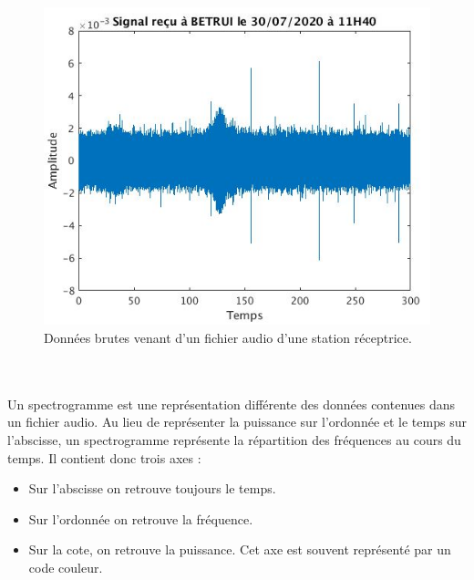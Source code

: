 \documentclass[11pt]{article}
\begin{document}
\begin{figure}[t] %
    \begin{center}
        \includegraphics[scale=0.5]{wav_brut.png}
        \caption{Données brutes venant d'un fichier audio d'une station réceptrice.}
    \end{center}
\end{figure}
\\
\\
Un spectrogramme est une représentation différente des données contenues dans un fichier audio.
Au lieu de représenter la puissance sur l'ordonnée et le temps sur l'abscisse, un spectrogramme représente la répartition des fréquences au cours du temps.
Il contient donc trois axes :
\begin{itemize}
    \item Sur l'abscisse on retrouve toujours le temps.
    \item Sur l'ordonnée on retrouve la fréquence.
    \item Sur la cote, on retrouve la puissance. Cet axe est souvent représenté par un code couleur.
\end{itemize}
\end{document}
